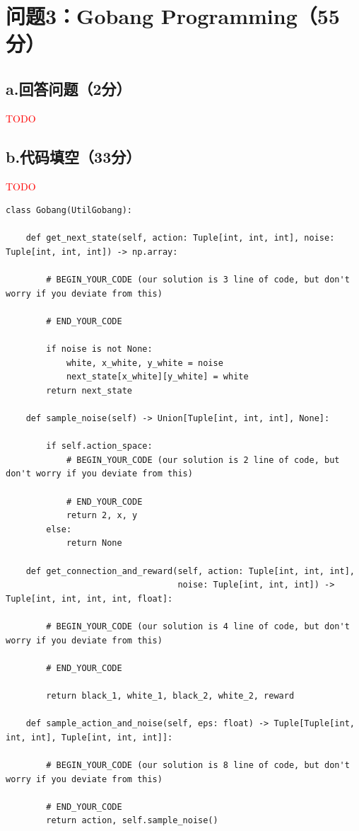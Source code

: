 \documentclass{article}
\begin{document}
\section*{问题3：Gobang Programming（55分）}
\subsection*{a.回答问题（2分）}
\textcolor{red}{TODO}

\subsection*{b.代码填空（33分）}
\textcolor{red}{TODO} 
\begin{lstlisting}
class Gobang(UtilGobang):
    
    def get_next_state(self, action: Tuple[int, int, int], noise: Tuple[int, int, int]) -> np.array:

        # BEGIN_YOUR_CODE (our solution is 3 line of code, but don't worry if you deviate from this)
        
        # END_YOUR_CODE

        if noise is not None:
            white, x_white, y_white = noise
            next_state[x_white][y_white] = white
        return next_state

    def sample_noise(self) -> Union[Tuple[int, int, int], None]:

        if self.action_space:
            # BEGIN_YOUR_CODE (our solution is 2 line of code, but don't worry if you deviate from this)
            
            # END_YOUR_CODE
            return 2, x, y
        else:
            return None

    def get_connection_and_reward(self, action: Tuple[int, int, int],
                                  noise: Tuple[int, int, int]) -> Tuple[int, int, int, int, float]:

        # BEGIN_YOUR_CODE (our solution is 4 line of code, but don't worry if you deviate from this)
        
        # END_YOUR_CODE

        return black_1, white_1, black_2, white_2, reward

    def sample_action_and_noise(self, eps: float) -> Tuple[Tuple[int, int, int], Tuple[int, int, int]]:

        # BEGIN_YOUR_CODE (our solution is 8 line of code, but don't worry if you deviate from this)

        # END_YOUR_CODE
        return action, self.sample_noise()


\end{lstlisting}
\end{document}

